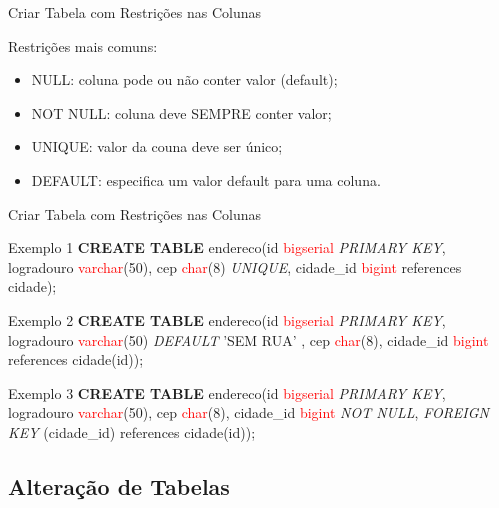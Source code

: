 \documentclass[xcolor=x11names,compress]{beamer}
\begin{document}
\begin{frame}{Criar Tabela com Restrições nas Colunas}

Restrições mais comuns:

\begin{itemize}
\itemsep 5mm

\item NULL: coluna pode ou não conter valor (default);

\item NOT NULL: coluna deve SEMPRE conter valor;

\item UNIQUE: valor da couna deve ser único;

\item DEFAULT: especifica um valor default para uma coluna.

\end{itemize}

\end{frame}

\begin{frame}[allowframebreaks]{Criar Tabela com Restrições nas Colunas}

\begin{alertblock}{Exemplo 1}
\textbf{CREATE TABLE} endereco(id \textcolor{red}{bigserial} \textit{PRIMARY KEY}, logradouro \textcolor{red}{varchar}(50), cep \textcolor{red}{char}(8) \textit{UNIQUE}, cidade\_id \textcolor{red}{bigint} references cidade);
\end{alertblock}

\begin{alertblock}{Exemplo 2}
\textbf{CREATE TABLE} endereco(id \textcolor{red}{bigserial} \textit{PRIMARY KEY}, logradouro \textcolor{red}{varchar}(50) \textit{DEFAULT} 'SEM RUA' , cep \textcolor{red}{char}(8), cidade\_id \textcolor{red}{bigint} references cidade(id));
\end{alertblock}

\begin{alertblock}{Exemplo 3}
\textbf{CREATE TABLE} endereco(id \textcolor{red}{bigserial} \textit{PRIMARY KEY}, logradouro \textcolor{red}{varchar}(50), cep \textcolor{red}{char}(8), cidade\_id \textcolor{red}{bigint} \textit{NOT NULL}, \textit{FOREIGN KEY} (cidade\_id) references cidade(id));
\end{alertblock}

\end{frame}

\subsection{Alteração de Tabelas}
\end{document}
